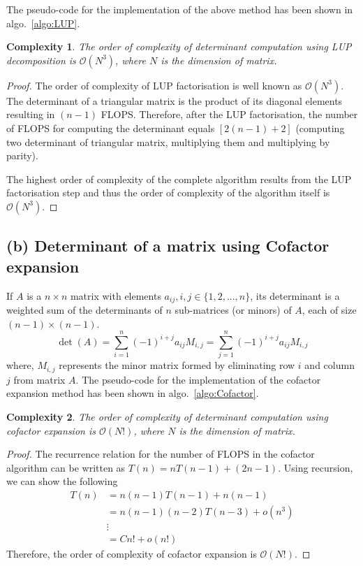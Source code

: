 \documentclass[11pt, oneside]{article}
\newtheorem*{order}{Complexity}
\begin{document}
  The pseudo-code for the implementation of the above method has been shown in algo.~\ref{algo:LUP}.
  

  \begin{order}
    The order of complexity of determinant computation using LUP decomposition is $\mathcal{O}(N^3)$, where $N$ is the dimension of matrix.
  \end{order}
  \begin{proof}
    The order of complexity of LUP factorisation is well known as $\mathcal{O}(N^3)$. The determinant of a triangular matrix is the product of its diagonal elements resulting in $(n-1)$ FLOPS. Therefore, after the LUP factorisation, the number of FLOPS for computing the determinant equals $[2(n-1)+2]$ (computing two determinant of triangular matrix, multiplying them and multiplying by parity).

    The highest order of complexity of the complete algorithm results from the LUP factorisation step and thus the order of complexity of the algorithm itself is $\mathcal{O}(N^3)$.
  \end{proof}

\subsection*{(b) Determinant of a matrix using Cofactor expansion}
If $A$ is a $n\times n$ matrix with elements $a_{ij}, i,j \in \{1,2,...,n\}$, its determinant is a weighted sum of the determinants of $n$ sub-matrices (or minors) of $A$, each of size $(n-1)\times (n-1)$.
\begin{equation*}
  \det (A) = \sum_{i=1}^{n} (-1)^{i+j} a_{ij}M_{i,j} = \sum_{j=1}^{n} (-1)^{i+j} a_{ij}M_{i,j}
\end{equation*}
where, $M_{i,j}$ represents the minor matrix formed by eliminating row $i$ and column $j$ from matrix $A$.
The pseudo-code for the implementation of the cofactor expansion method has been shown in algo.~\ref{algo:Cofactor}.


\begin{order}
  The order of complexity of determinant computation using cofactor expansion is $\mathcal{O}(N!)$, where $N$ is the dimension of matrix.
\end{order}
\begin{proof}
  The recurrence relation for the number of FLOPS in the cofactor algorithm can be written as $T(n) = n T(n-1) + (2n - 1)$. Using recursion, we can show the following
  \begin{align*}
    T(n) &= n (n-1) T(n-1) + n (n-1)\\
         &= n(n-1)(n-2)T(n-3) + o(n^3)\\
         & \vdots\\
         &= C n! + o(n!)
  \end{align*}
  Therefore, the order of complexity of cofactor expansion is $\mathcal{O}(N!)$.
\end{proof}
\end{document}
